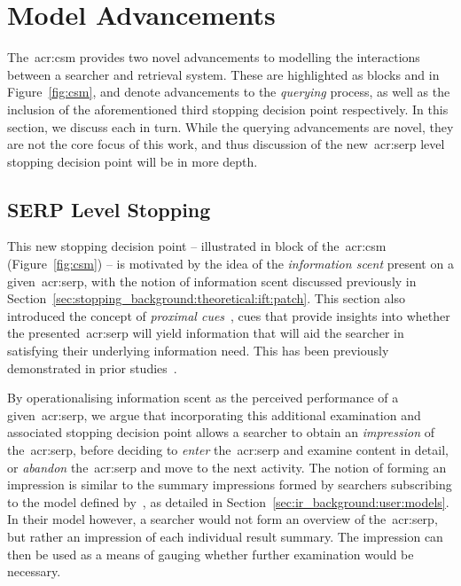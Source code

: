 \section{Model Advancements}\label{sec:csm:advancements}
The~\gls{acr:csm} provides two novel advancements to modelling the interactions between a searcher and retrieval system. These are highlighted as blocks  and  in Figure~\ref{fig:csm}, and denote advancements to the \emph{querying} process, as well as the inclusion of the aforementioned third stopping decision point respectively. In this section, we discuss each in turn. While the querying advancements are novel, they are not the core focus of this work, and thus discussion of the new~\gls{acr:serp} level stopping decision point will be in more depth.

\subsection{SERP Level Stopping}\label{sec:csm:advancements:stopping}
This new stopping decision point -- illustrated in block  of the~\gls{acr:csm} (Figure~\ref{fig:csm}) -- is motivated by the idea of the \emph{information scent} present on a given~\gls{acr:serp}, with the notion of information scent discussed previously in Section~\ref{sec:stopping_background:theoretical:ift:patch}. This section also introduced the concept of \emph{proximal cues}~\citep{chi2001information_scent}, cues that provide insights into whether the presented~\gls{acr:serp} will yield information that will aid the searcher in satisfying their underlying information need. This has been previously demonstrated in prior studies~\citep{wu2014information_scent, ong2017scent_behaviour, maxwell2017snippets}.

By operationalising information scent as the perceived performance of a given~\gls{acr:serp}, we argue that incorporating this additional examination and associated stopping decision point allows a searcher to obtain an \emph{impression} of the~\gls{acr:serp}, before deciding to \emph{enter} the~\gls{acr:serp} and examine content in detail, or \emph{abandon} the~\gls{acr:serp} and move to the next activity. The notion of forming an impression is similar to the summary impressions formed by searchers subscribing to the model defined by~\cite{thomas2014modelling_behaviour}, as detailed in Section~\ref{sec:ir_background:user:models}. In their model however, a searcher would not form an overview of the~\gls{acr:serp}, but rather an impression of each individual result summary. The impression can then be used as a means of gauging whether further examination would be necessary.

